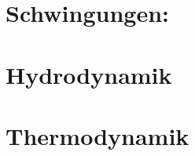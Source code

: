 \documentclass[final, 12pt]{article}
\begin{document}
  



\section{Schwingungen:}


\section{Hydrodynamik}


\section{Thermodynamik}


\newpage
\end{document}
